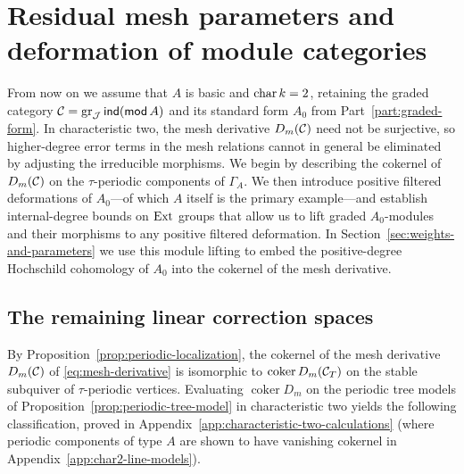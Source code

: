 \section{Residual mesh parameters and deformation of module categories}
\label{sec:positive-deformations}

From now on we assume that $A$ is basic and $\operatorname{char} k=2$, retaining the
graded category $\mathcal C=\operatorname{gr}_\mathcal J\operatorname{\mathsf{ind}}(\operatorname{\mathsf{mod}} A)$ and its standard form $A_0$ from
Part~\ref{part:graded-form}. In characteristic two, the mesh derivative
$D_m(\mathcal C)$ need not be surjective, so higher-degree error terms in the mesh
relations cannot in general be eliminated by adjusting the irreducible
morphisms. We begin by describing the cokernel of $D_m(\mathcal C)$ on the
$\tau$-periodic components of $\Gamma_A$. We then introduce positive
filtered deformations of $A_0$—of which $A$ itself is the primary
example—and establish internal-degree bounds on $\operatorname{Ext}$ groups that allow us
to lift graded $A_0$-modules and their morphisms to any positive filtered
deformation. In Section~\ref{sec:weights-and-parameters} we use this module
lifting to embed the positive-degree Hochschild cohomology of $A_0$ into the
cokernel of the mesh derivative.

\subsection{The remaining linear correction spaces}

By Proposition~\ref{prop:periodic-localization}, the cokernel of the mesh
derivative $D_m(\mathcal C)$ of \eqref{eq:mesh-derivative} is isomorphic to
$\operatorname{coker}D_m(\mathcal C_T)$ on the stable subquiver of $\tau$-periodic
vertices. Evaluating $\operatorname{coker}D_m$ on the periodic tree models
of Proposition~\ref{prop:periodic-tree-model} in characteristic two yields
the following classification, proved in
Appendix~\ref{app:characteristic-two-calculations} (where periodic
components of type $A$ are shown to have vanishing cokernel in
Appendix~\ref{app:char2-line-models}).

